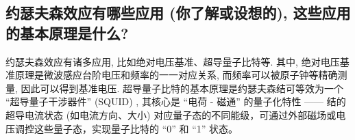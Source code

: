 \documentclass[font=default]{mpltx}
\begin{document}
\subsection{约瑟夫森效应有哪些应用 (你了解或设想的), 这些应用的基本原理是什么? }
约瑟夫森效应有诸多应用, 比如绝对电压基准、超导量子比特等. 其中, 绝对电压基准原理是微波感应台阶电压和频率的一一对应关系, 而频率可以被原子钟等精确测量, 因此可以得到基准电压.
超导量子比特的基本原理是约瑟夫森结可等效为一个 “超导量子干涉器件” (SQUID) , 其核心是 “电荷 - 磁通” 的量子化特性 —— 结的超导电流状态 (如电流方向、大小) 对应量子态的不同能级，可通过外部磁场或电压调控这些量子态，实现量子比特的 “0” 和 “1” 状态。







\end{document}
